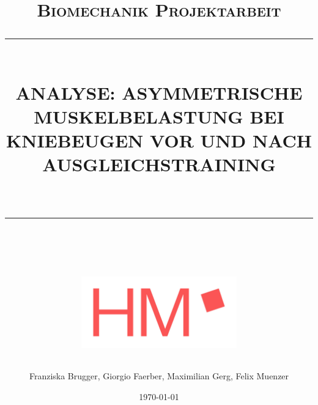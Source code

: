 \documentclass[11pt, titlepage, twoside]{scrartcl}
\newcommand{\HRule}[1]{\rule{\linewidth}{#1}}
\numberwithin{figure}{section}
\numberwithin{table}{section}
\numberwithin{equation}{section}
\begin{document}
\fancyfoot[C]{\thepage}
\setlength {\marginparwidth }{2cm}


\begin{titlepage}
   \title{ \normalsize \textsc{Biomechanik Projektarbeit}
         \\ [1.0cm]
         \HRule{0.1pt} \\
         \LARGE \textbf{
             \uppercase{Analyse: asymmetrische  Muskelbelastung bei Kniebeugen vor und nach Ausgleichstraining\\}\\
         }
         \HRule{2pt} \\ [0.5cm]
         \begin{figure}[h!]
               \centering
               \includegraphics[width=0.6\textwidth]{img/Logo_hm.jpg}
           \end{figure}
           }

   \date{\today}

   \author{
           Franziska Brugger,
           Giorgio Faerber,
           Maximilian Gerg,
           Felix Muenzer
           }


   \end{titlepage}
   \maketitle
   \tableofcontents %
   ~\newpage
   \setcounter{page}{1}
   \listoffigures
   \listoftables
   \newpage

\end{document}
